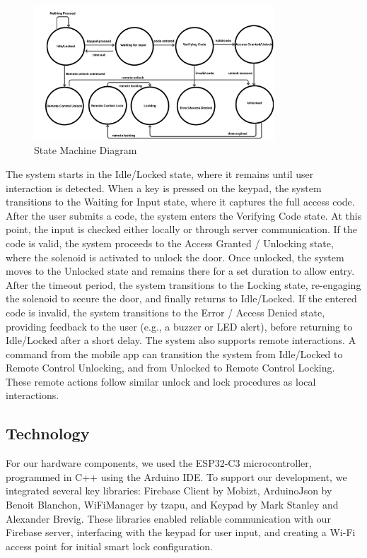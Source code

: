 \begin{figure}[ht]
    \centering
    \includegraphics[width=0.80\textwidth]{img/stateTransitionDiagram.png}
    \caption{State Machine Diagram}
    \label{fig:stateTransitionDiagram}
\end{figure}

The system starts in the Idle/Locked state, where it remains until user interaction is detected. When a key is pressed on the keypad, the system transitions to the Waiting for Input state, where it captures the full access code. After the user submits a code, the system enters the Verifying Code state. At this point, the input is checked either locally or through server communication. If the code is valid, the system proceeds to the Access Granted / Unlocking state, where the solenoid is activated to unlock the door. Once unlocked, the system moves to the Unlocked state and remains there for a set duration to allow entry. After the timeout period, the system transitions to the Locking state, re-engaging the solenoid to secure the door, and finally returns to Idle/Locked. If the entered code is invalid, the system transitions to the Error / Access Denied state, providing feedback to the user (e.g., a buzzer or LED alert), before returning to Idle/Locked after a short delay. The system also supports remote interactions. A command from the mobile app can transition the system from Idle/Locked to Remote Control Unlocking, and from Unlocked to Remote Control Locking. These remote actions follow similar unlock and lock procedures as local interactions.

\subsection{Technology}
For our hardware components, we used the ESP32-C3 microcontroller, programmed in C++ using the Arduino IDE. To support our development, we integrated several key libraries: Firebase Client by Mobizt, ArduinoJson by Benoit Blanchon, WiFiManager by tzapu, and Keypad by Mark Stanley and Alexander Brevig. These libraries enabled reliable communication with our Firebase server, interfacing with the keypad for user input, and creating a Wi-Fi access point for initial smart lock configuration. 


